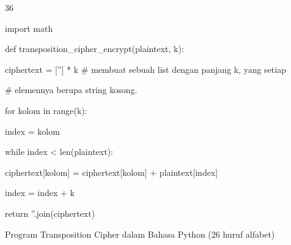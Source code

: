 \documentclass{article}
\begin{document}

36

import math

def transposition\_cipher\_encrypt(plaintext, k):

    ciphertext = [''] * k      \# membuat sebuah list dengan panjang k, yang setiap

                               \# elemennya berupa string kosong.      

    for kolom in range(k):

        index = kolom

        while index < len(plaintext):

            ciphertext[kolom] = ciphertext[kolom] + plaintext[index]

            index = index + k

    return ''.join(ciphertext)

Program Transposition Cipher dalam Bahasa Python  (26 huruf alfabet)
\end{document}
